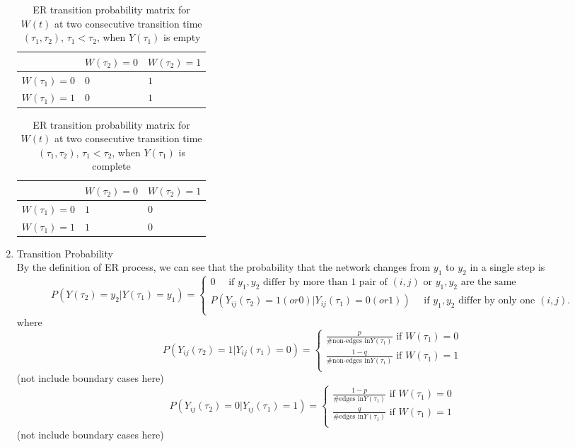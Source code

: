 \documentclass[10pt,letterpaper]{article}
\numberwithin{table}{section}
\numberwithin{figure}{section}
\numberwithin{equation}{section}
\begin{document}
\begin{enumerate}
\begin{table}[H]
\centering
\begin{tabular}{lll}
\hline
 &  $W(\tau_2)=0$&  $W(\tau_2)=1$\\\hline
$W(\tau_1)=0$ &  $0$ &  $1$\\
$W(\tau_1)=1$ &  $0$ & $1$\\\hline
\end{tabular}
\caption{ER transition probability matrix for $W(t)$ at two consecutive transition time $(\tau_1, \tau_2)$, $\tau_1 < \tau_2$, when $Y(\tau_1)$ is empty}
\label{tab1.2}
\end{table}

\begin{table}[H]
\centering
\begin{tabular}{lll}
\hline
 &  $W(\tau_2)=0$&  $W(\tau_2)=1$\\\hline
$W(\tau_1)=0$ &  $1$ &  $0$\\
$W(\tau_1)=1$ &  $1$ & $0$\\\hline
\end{tabular}
\caption{ER transition probability matrix for $W(t)$ at two consecutive transition time $(\tau_1, \tau_2)$, $\tau_1 < \tau_2$, when $Y(\tau_1)$ is complete}
\label{tab1.3}
\end{table}

\item Transition Probability \\
By the definition of ER process, we can see that the probability that the network changes from $y_1$ to $y_2$ in a single step is 
\begin{equation}
\label{1.8}
P(Y(\tau_2) = y_2|Y(\tau_1) = y_1) 
= \begin{cases}
0 \quad \text{ if } y_1, y_2 \text{ differ by more than 1 pair of } (i,j) \text{ or }y_1, y_2 \text{ are the same} \\
P(Y_{ij}(\tau_2) = 1 (or 0)|Y_{ij}(\tau_1) = 0 (or 1)) \quad \text{ if } y_1, y_2 \text{ differ by only one } (i,j). \\
\end{cases} 
\end{equation}
where 
\begin{equation}
P(Y_{ij}(\tau_2) = 1|Y_{ij}(\tau_1) = 0) = 
\begin{cases}
\frac{p}{\# \text{non-edges in}Y(\tau_1)} \text{  if  }  W(\tau_1) = 0 \\
\frac{1-q}{\# \text{non-edges in}Y(\tau_1)} \text{  if  } W(\tau_1) = 1 \\
\end{cases}
\end{equation}
(not include boundary cases here)
\begin{equation}
P(Y_{ij}(\tau_2) = 0|Y_{ij}(\tau_1) = 1) = 
\begin{cases}
\frac{1-p}{\# \text{edges in}Y(\tau_1)} \text{  if  }  W(\tau_1) = 0 \\
\frac{q}{\# \text{edges in}Y(\tau_1)} \text{  if  } W(\tau_1) = 1 \\
\end{cases}
\end{equation}
(not include boundary cases here)


\end{enumerate}
\end{document}
